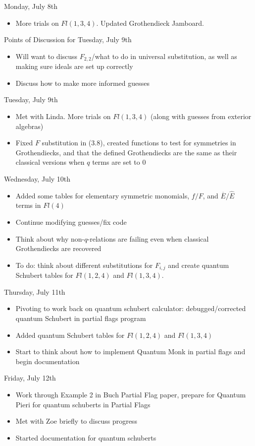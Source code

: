 Monday, July 8th
\begin{itemize}
    \item More trials on $Fl(1, 3, 4)$. Updated Grothendieck Jamboard.
\end{itemize}

Points of Discussion for Tuesday, July 9th
\begin{itemize}
    \item Will want to discuss $F_{2, 2}$/what to do in universal substitution, as well as making sure ideals are set up correctly
    \item Discuss how to make more informed guesses
\end{itemize}

Tuesday, July 9th
\begin{itemize}
    \item Met with Linda. More trials on $Fl(1, 3, 4)$ (along with guesses from exterior algebras)
    \item Fixed $F$ substitution in (3.8), created functions to test for symmetries in Grothendiecks, and that the defined Grothendiecks are the same as their classical versions when $q$ terms are set to $0$
\end{itemize}

Wednesday, July 10th
\begin{itemize}
    \item Added some tables for elementary symmetric monomials, $f/F$, and $\overline{E}/\hat{E}$ terms in $Fl(4)$
    \item Continue modifying guesses/fix code
    \item Think about why non-$q$-relations are failing even when classical Grothendiecks are recovered
    \item To do: think about different substitutions for $F_{i, j}$ and create quantum Schubert tables for $Fl(1, 2, 4)$ and $Fl(1, 3, 4)$.
\end{itemize}

Thursday, July 11th
\begin{itemize}
    \item Pivoting to work back on quantum schubert calculator: debugged/corrected quantum Schubert in partial flags program
    \item Added quantum Schubert tables for $Fl(1, 2, 4)$ and $Fl(1, 3, 4)$
    \item Start to think about how to implement Quantum Monk in partial flags and begin documentation
\end{itemize}

Friday, July 12th
\begin{itemize}
    \item Work through Example 2 in Buch Partial Flag paper, prepare for Quantum Pieri for quantum schuberts in Partial Flags
    \item Met with Zoe briefly to discuss progress
    \item Started documentation for quantum schuberts
\end{itemize}
